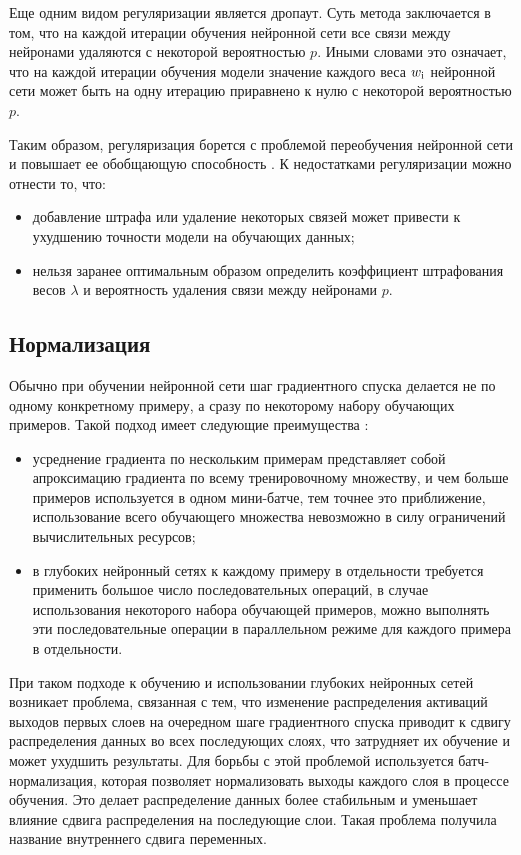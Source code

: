 Еще одним видом регуляризации является дропаут. Суть метода заключается в том, что на каждой итерации обучения нейронной сети все связи между нейронами удаляются с некоторой вероятностью $p$. Иными словами это означает, что на каждой итерации обучения модели значение каждого веса $w_{\rm{i}}$ нейронной сети может быть на одну итерацию приравнено к нулю с некоторой вероятностью $p$.

Таким образом, регуляризация борется с проблемой переобучения нейронной сети и повышает ее обобщающую способность \cite{regulisation}. К недостатками регуляризации можно отнести то, что:
\begin{itemize}
	\item добавление штрафа или удаление некоторых связей может привести к ухудшению точности модели на обучающих данных;
	\item нельзя заранее оптимальным образом определить коэффициент штрафования весов $\lambda$ и вероятность удаления связи между нейронами $p$.
\end{itemize}

\subsection{Нормализация}
Обычно при обучении нейронной сети шаг градиентного спуска делается не по одному конкретному примеру, а сразу по некоторому набору обучающих примеров. Такой подход имеет следующие преимущества \cite{regulisation}:
\begin{itemize}
	\item усреднение градиента по нескольким примерам представляет собой апроксимацию градиента по всему тренировочному множеству, и чем больше примеров используется в одном мини-батче, тем точнее это приближение, использование всего обучающего множества невозможно в силу ограничений вычислительных ресурсов;
	\item в глубоких нейронный сетях к каждому примеру в отдельности требуется применить большое число последовательных операций, в случае использования некоторого набора обучающей примеров, можно выполнять эти последовательные операции в параллельном режиме для каждого примера в отдельности.
\end{itemize}

При таком подходе к обучению и использовании глубоких нейронных сетей возникает проблема, связанная с тем, что изменение распределения активаций выходов первых слоев на очередном шаге градиентного спуска приводит к сдвигу распределения данных во всех последующих слоях, что затрудняет их обучение и может ухудшить результаты. Для борьбы с этой проблемой используется батч-нормализация, которая позволяет нормализовать выходы каждого слоя в процессе обучения. Это делает распределение данных более стабильным и уменьшает влияние сдвига распределения на последующие слои. Такая проблема получила название внутреннего сдвига переменных.

